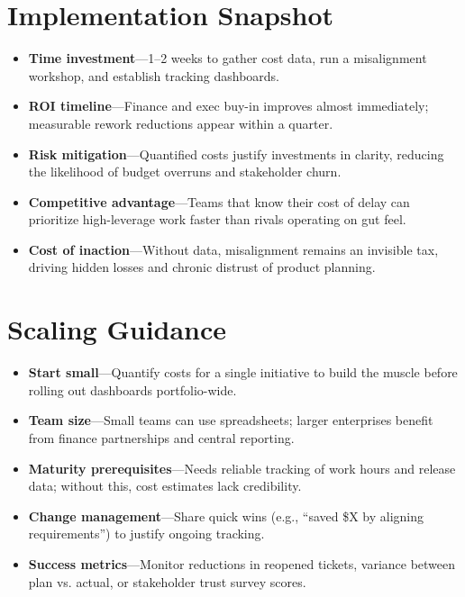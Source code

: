 \section{Implementation Snapshot}
\label{sec:costs-snapshot}
\begin{itemize}
    \item \textbf{Time investment}—1--2 weeks to gather cost data, run a misalignment workshop, and establish tracking dashboards.
    \item \textbf{ROI timeline}—Finance and exec buy-in improves almost immediately; measurable rework reductions appear within a quarter.
    \item \textbf{Risk mitigation}—Quantified costs justify investments in clarity, reducing the likelihood of budget overruns and stakeholder churn.
    \item \textbf{Competitive advantage}—Teams that know their cost of delay can prioritize high-leverage work faster than rivals operating on gut feel.
    \item \textbf{Cost of inaction}—Without data, misalignment remains an invisible tax, driving hidden losses and chronic distrust of product planning.
\end{itemize}

\section{Scaling Guidance}
\label{sec:costs-scaling}
\begin{itemize}
    \item \textbf{Start small}—Quantify costs for a single initiative to build the muscle before rolling out dashboards portfolio-wide.
    \item \textbf{Team size}—Small teams can use spreadsheets; larger enterprises benefit from finance partnerships and central reporting.
    \item \textbf{Maturity prerequisites}—Needs reliable tracking of work hours and release data; without this, cost estimates lack credibility.
    \item \textbf{Change management}—Share quick wins (e.g., “saved \$X by aligning requirements”) to justify ongoing tracking.
    \item \textbf{Success metrics}—Monitor reductions in reopened tickets, variance between plan vs. actual, or stakeholder trust survey scores.
\end{itemize}

